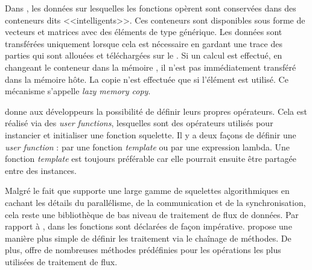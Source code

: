 Dans , les donn\'ees sur lesquelles les fonctions opèrent sont conserv\'ees dans des conteneurs dits <<intelligents>>. Ces conteneurs sont disponibles sous forme de vecteurs et matrices avec des \'el\'ements de type g\'en\'erique. Les donn\'ees sont transf\'er\'ees uniquement lorsque cela est n\'ecessaire en gardant une trace des parties qui sont allou\'ees et t\'el\'echarg\'ees sur le . Si un calcul est effectu\'e, en changeant le conteneur dans la m\'emoire , il n'est pas imm\'ediatement transf\'er\'e dans la m\'emoire h\^ote. La copie n'est effectu\'ee que si l'\'el\'ement est utilis\'e. Ce m\'ecanisme s'appelle \emph{lazy memory copy}.



 donne aux d\'eveloppeurs la possibilit\'e de d\'efinir leurs propres op\'erateurs. Cela est r\'ealis\'e via des \emph{user functions}, lesquelles sont des op\'erateurs utilis\'es pour instancier et initialiser une fonction squelette. Il y a deux fa\c{c}ons de d\'efinir une \emph{user function} : par une fonction \emph{template} ou par une expression lambda. Une fonction \emph{template} est toujours pr\'ef\'erable car elle pourrait ensuite \^etre partag\'ee entre des instances.


Malgr\'e le fait que  supporte une large gamme de squelettes algorithmiques en cachant les d\'etails du parall\'elisme, de la communication et de la synchronisation, cela reste une biblioth\`eque de bas niveau de traitement de flux de donn\'ees. Par rapport \`a , dans  les fonctions sont d\'eclar\'ees de fa\c{c}on imp\'erative.  propose une mani\`ere plus simple de d\'efinir les traitement via le cha\^inage de m\'ethodes. De plus,  offre de nombreuses m\'ethodes pr\'ed\'efinies pour les op\'erations les plus utilis\'ees de traitement de flux.
